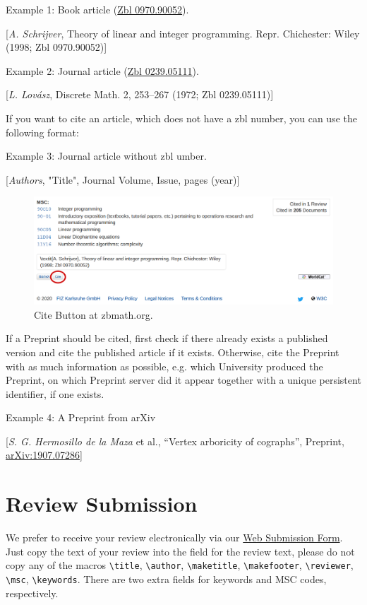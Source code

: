 \documentclass{zbMATH}
\begin{document}
Example 1: Book article (\href{https://zbmath.org/?q=an\%3A0970.90052}{Zbl 0970.90052}).

{[\textit{A. Schrijver}, Theory of linear and integer programming. Repr. Chichester: Wiley (1998; Zbl 0970.90052)]}

Example 2: Journal article (\href{https://zbmath.org/?q=an\%3A0239.05111}{Zbl 0239.05111}).

{[\textit{L. Lovász}, Discrete Math. 2, 253--267 (1972; Zbl 0239.05111)]}

If you want to cite an article, which does not have a zbl number, you can use the following format:

Example 3: Journal article without zbl umber.

{[\textit{Authors}, "Title", Journal Volume, Issue, pages (year)]}

\begin{figure}[bth]
    \centering
    \includegraphics[width=\textwidth]{figures/screenshot.png}
    \caption{Cite Button at zbmath.org.}
    \label{fig:cite}
\end{figure}

If a Preprint should be cited, first check if there already exists a published version and cite the published article if it exists. Otherwise, cite the Preprint with as much information as possible, e.g. which University produced the Preprint, on which Preprint server did it appear together with a unique persistent identifier, if one exists. 

Example 4: A Preprint from arXiv

{[\textit{S. G. Hermosillo de la Maza} et al., “Vertex arboricity of cographs”, Preprint, \href{https://arxiv.org/abs/1907.07286}{arXiv:1907.07286}]}

\section*{Review Submission}

We prefer to receive your review electronically via our \href{https://zbmath.org/reviewer-service/}{Web Submission Form}. Just copy the text of your review into the field for the review text, please do not copy any of the macros \verb|\title|, \verb|\author|, \verb|\maketitle|, \verb|\makefooter|, \verb|\reviewer|, \verb|\msc|, \verb|\keywords|. There are two extra fields for keywords and MSC codes, respectively.
\end{document}
